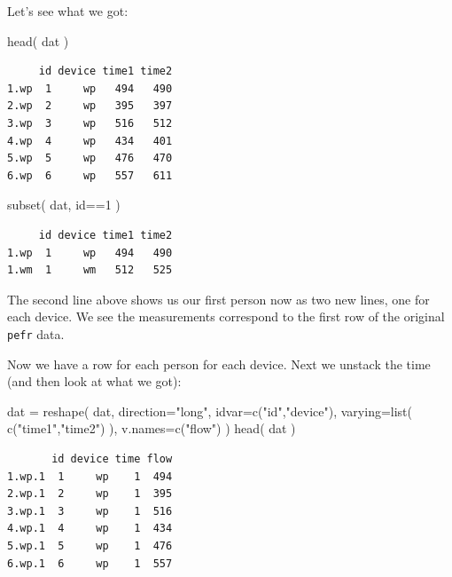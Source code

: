 \documentclass[
  letterpaper,
  DIV=11,
  numbers=noendperiod]{scrreprt}
\newenvironment{Shaded}{}{}
\newcommand{\AttributeTok}[1]{\textcolor[rgb]{0.49,0.56,0.16}{#1}}
\newcommand{\DecValTok}[1]{\textcolor[rgb]{0.25,0.63,0.44}{#1}}
\newcommand{\FunctionTok}[1]{\textcolor[rgb]{0.02,0.16,0.49}{#1}}
\newcommand{\NormalTok}[1]{#1}
\newcommand{\OtherTok}[1]{\textcolor[rgb]{0.00,0.44,0.13}{#1}}
\newcommand{\SpecialCharTok}[1]{\textcolor[rgb]{0.25,0.44,0.63}{#1}}
\newcommand{\StringTok}[1]{\textcolor[rgb]{0.25,0.44,0.63}{#1}}
\begin{document}
Let's see what we got:

\begin{Shaded}
\begin{Highlighting}[]
\FunctionTok{head}\NormalTok{( dat )}
\end{Highlighting}
\end{Shaded}

\begin{verbatim}
     id device time1 time2
1.wp  1     wp   494   490
2.wp  2     wp   395   397
3.wp  3     wp   516   512
4.wp  4     wp   434   401
5.wp  5     wp   476   470
6.wp  6     wp   557   611
\end{verbatim}

\begin{Shaded}
\begin{Highlighting}[]
\FunctionTok{subset}\NormalTok{( dat, id}\SpecialCharTok{==}\DecValTok{1}\NormalTok{ )}
\end{Highlighting}
\end{Shaded}

\begin{verbatim}
     id device time1 time2
1.wp  1     wp   494   490
1.wm  1     wm   512   525
\end{verbatim}

The second line above shows us our first person now as two new lines,
one for each device. We see the measurements correspond to the first row
of the original \texttt{pefr} data.

Now we have a row for each person for each device. Next we unstack the
time (and then look at what we got):

\begin{Shaded}
\begin{Highlighting}[]
\NormalTok{dat }\OtherTok{=} \FunctionTok{reshape}\NormalTok{( dat, }\AttributeTok{direction=}\StringTok{"long"}\NormalTok{, }\AttributeTok{idvar=}\FunctionTok{c}\NormalTok{(}\StringTok{"id"}\NormalTok{,}\StringTok{"device"}\NormalTok{),}
               \AttributeTok{varying=}\FunctionTok{list}\NormalTok{( }\FunctionTok{c}\NormalTok{(}\StringTok{"time1"}\NormalTok{,}\StringTok{"time2"}\NormalTok{) ),}
               \AttributeTok{v.names=}\FunctionTok{c}\NormalTok{(}\StringTok{"flow"}\NormalTok{) )}
\FunctionTok{head}\NormalTok{( dat )}
\end{Highlighting}
\end{Shaded}

\begin{verbatim}
       id device time flow
1.wp.1  1     wp    1  494
2.wp.1  2     wp    1  395
3.wp.1  3     wp    1  516
4.wp.1  4     wp    1  434
5.wp.1  5     wp    1  476
6.wp.1  6     wp    1  557
\end{verbatim}
\end{document}
